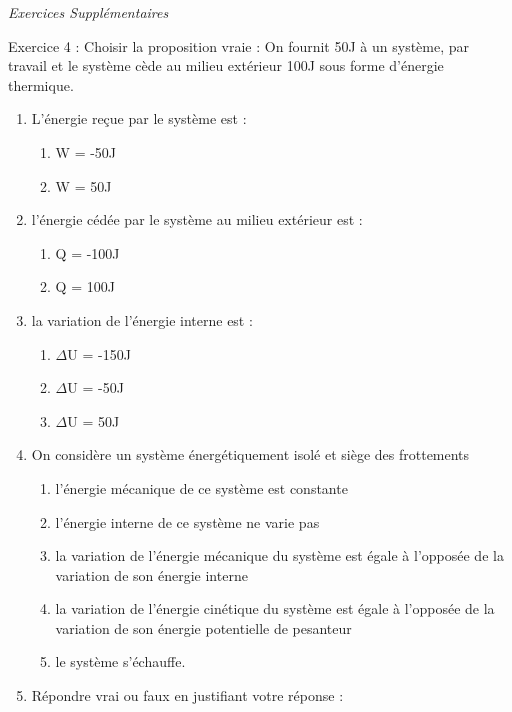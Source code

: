 \documentclass[12pt, french]{article}
\begin{document}
\vspace{2cm}
\begin{center}
   \Large{ \em{Exercices Supplémentaires}}
\end{center}
\begin{Box2}{Exercice 4 : }
Choisir la proposition vraie :
On fournit 50J à un système, par travail et le système cède au milieu extérieur 100J sous forme
d’énergie thermique.
  \begin{enumerate}
    \item L’énergie reçue par le système est :
      \begin{enumerate}
        \item W = -50J
        \item W = 50J
      \end{enumerate}
    \item l’énergie cédée par le système au milieu extérieur est :
       \begin{enumerate}
        \item Q = -100J
        \item Q = 100J
      \end{enumerate}
    \item la variation de l’énergie interne est :
 \begin{enumerate}
        \item $\Delta$U = -150J
        \item $\Delta$U = -50J
        \item $\Delta$U = 50J
      \end{enumerate}
      \item On considère un système énergétiquement isolé et siège des frottements
        \begin{enumerate}
          \item l’énergie mécanique de ce système est constante
          \item l’énergie interne de ce système ne varie pas
            \item la variation de l’énergie mécanique du système est égale à l’opposée de la variation de son
énergie interne
\item la variation de l’énergie cinétique du système est égale à l’opposée de la variation de son
énergie potentielle de pesanteur
\item le système s’échauffe.
        \end{enumerate}
        \item Répondre vrai ou faux en justifiant votre réponse :

\end{enumerate}
\end{Box2}
\end{document}
